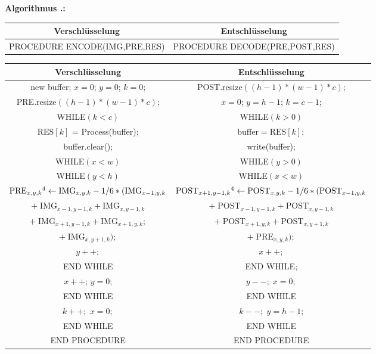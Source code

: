 \documentclass[a4paper,12pt]{article}
\newcounter{Algorithmus}
\newenvironment{Algorithmus}{
\medskip
        
        \setlength{\parindent}{0pt}
        \addtocounter{Algorithmus}{1}
        \textbf{\textsf{Algorithmus \thesubsection.\theAlgorithmus}:}}{
        \nopagebreak
        \vspace{-1.0ex}
        \bigskip
        
}
\begin{document}
\begin{Algorithmus}
\\
\begin{tabular}{c|c}
Verschlüsselung & Entschlüsselung
\\
\hline
PROCEDURE ENCODE(IMG,PRE,RES) & PROCEDURE DECODE(PRE,POST,RES)
\end{tabular}
\begin{tabular}{c|c}
Verschlüsselung & Entschlüsselung
\\
\hline
new buffer; $x=0$; $y=0$; $k=0$; & POST.resize$((h-1)*(w-1)*c)$;
\\
PRE.resize$((h-1)*(w-1)*c)$; & $x=0$; $y=h-1$; $k=c-1$;
\\
WHILE$(k < c)$ &                  WHILE$(k > 0)$
\\
RES$[k]$ = Process(buffer); &  $\text{buffer} = \text{RES}[k];$
\\
buffer.clear(); & write(buffer); 
\\
WHILE$(x < w)$ &   WHILE$(y > 0)$          
\\
WHILE$(y < h)$ &   WHILE$(x<w)$     
\\
$\text{PRE}_{x,y,k}\footnotemark[4]\leftarrow \text{IMG}_{x,y,k} - 1/6 *(\text{IMG}_{x-1,y,k}$ &  $\text{POST}_{x+1,y-1,k}\footnotemark[4]\leftarrow \text{POST}_{x,y,k} - 1/6 *(\text{POST}_{x-1,y,k} $ 
\\
$+\;\text{IMG}_{x-1,y-1,k} + \text{IMG}_{x,y-1,k}$ & $+\;\text{POST}_{x-1,y-1,k} + \text{POST}_{x,y-1,k}$  
\\
$+\;\text{IMG}_{x+1,y-1,k} + \text{IMG}_{x+1,y,k};$ & $+\;\text{POST}_{x+1,y,k} + \text{POST}_{x,y+1,k}  $
\\
 $+\;\text{IMG}_{x,y+1,k});$    &   $+\; \text{PRE}_{x,y,k});$
\\
 $y++;$  & $x++;$
\\
END WHILE   & END WHILE;
\\
$x++$; $y=0$;    & $y--;\;x=0;$  
\\
END WHILE   & END WHILE 
\\
$k++;$ $x=0;$  &  $k--;$ $y=h-1$;
\\
END WHILE    &   END WHILE 
\\
END PROCEDURE & END PROCEDURE
\end{tabular}
\end{Algorithmus}
\end{document}
